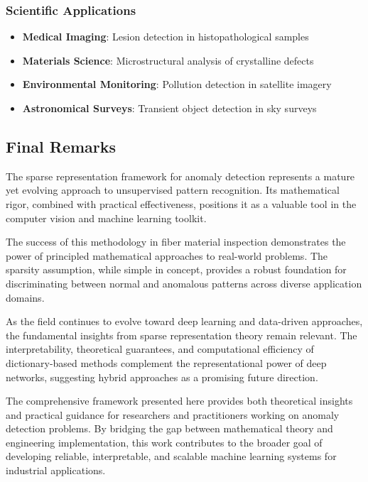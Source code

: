 \documentclass[12pt]{article}
\begin{document}
\subsubsection{Scientific Applications}
\label{subsubsec:scientific_applications}

\begin{itemize}[leftmargin=*]
    \item \textbf{Medical Imaging}: Lesion detection in histopathological samples
    \item \textbf{Materials Science}: Microstructural analysis of crystalline defects
    \item \textbf{Environmental Monitoring}: Pollution detection in satellite imagery
    \item \textbf{Astronomical Surveys}: Transient object detection in sky surveys
\end{itemize}

\subsection{Final Remarks}
\label{subsec:final_remarks}

The sparse representation framework for anomaly detection represents a mature yet evolving approach to unsupervised pattern recognition. Its mathematical rigor, combined with practical effectiveness, positions it as a valuable tool in the computer vision and machine learning toolkit.

The success of this methodology in fiber material inspection demonstrates the power of principled mathematical approaches to real-world problems. The sparsity assumption, while simple in concept, provides a robust foundation for discriminating between normal and anomalous patterns across diverse application domains.

As the field continues to evolve toward deep learning and data-driven approaches, the fundamental insights from sparse representation theory remain relevant. The interpretability, theoretical guarantees, and computational efficiency of dictionary-based methods complement the representational power of deep networks, suggesting hybrid approaches as a promising future direction.

The comprehensive framework presented here provides both theoretical insights and practical guidance for researchers and practitioners working on anomaly detection problems. By bridging the gap between mathematical theory and engineering implementation, this work contributes to the broader goal of developing reliable, interpretable, and scalable machine learning systems for industrial applications.
\newpage
\end{document}
